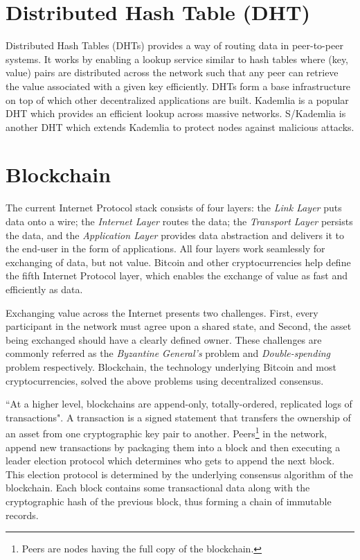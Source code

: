 \section{Distributed Hash Table (DHT)}
	Distributed Hash Tables (DHTs)\cite{galuba2009distributed} provides a way of routing data in peer-to-peer systems. It works by enabling a lookup service similar to hash tables where (key, value) pairs are distributed across the network such that any peer can retrieve the value associated with a given key efficiently. DHTs form a base infrastructure on top of which other decentralized applications are built. Kademlia\cite{maymounkov2002kademlia} is a popular DHT which provides an efficient lookup across massive networks. S/Kademlia\cite{baumgart2007s} is another DHT which extends Kademlia to protect nodes against malicious attacks.

\section{Blockchain}
	The current Internet Protocol stack consists of four layers: the \textit{Link Layer} puts data onto a wire; the \textit{Internet Layer} routes the data; the \textit{Transport Layer} persists the data, and the \textit{Application Layer} provides data abstraction and delivers it to the end-user in the form of applications. All four layers work seamlessly for exchanging of data, but not value. Bitcoin\cite{nakamoto2008bitcoin} and other cryptocurrencies help define the fifth Internet Protocol layer, which enables the exchange of value as fast and efficiently as data\cite{raval2016decentralized}.
	
	Exchanging value across the Internet presents two challenges. First, every participant in the network must agree upon a shared state, and Second, the asset being exchanged should have a clearly defined owner. These challenges are commonly referred as the \textit{Byzantine General's} problem\cite{lamport1982byzantine} and \textit{Double-spending} problem\cite{chohan2017double} respectively. Blockchain, the technology underlying Bitcoin and most cryptocurrencies, solved the above problems using decentralized consensus\cite{Coulouris:2011:DSC:2029110}.
	
	``At a higher level, blockchains are append-only, totally-ordered, replicated logs of transactions"\cite{bonneau2015research}. A transaction is a signed statement that transfers the ownership of an asset from one cryptographic key pair to another. Peers\footnote{Peers are nodes having the full copy of the blockchain.} in the network, append new transactions by packaging them into a block and then executing a leader election protocol which determines who gets to append the next block\cite{nelson2016extending}. This election protocol is determined by the underlying consensus algorithm of the blockchain. Each block contains some transactional data along with the cryptographic hash of the previous block, thus forming a chain of immutable records.